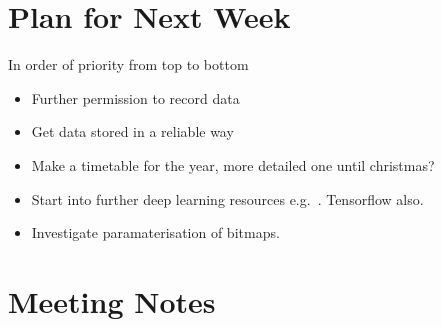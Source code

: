 \documentclass[]{weekly-report}
\begin{document}
\section{Plan for Next Week}
In order of priority from top to bottom

\begin{itemize}
\item Further permission to record data

\item Get data stored in a reliable way

\item Make a timetable for the year, more detailed one until christmas?

\item Start into further deep learning resources e.g.~\cite{Ng-Coursera-2016, VincentVanhoucke-Udacity-2016, Nvidia-DL-Course-2016}. Tensorflow also.

\item Investigate paramaterisation of bitmaps.

\end{itemize}

\section{Meeting Notes}





{}



\label{last_page}

 
\end{document}
